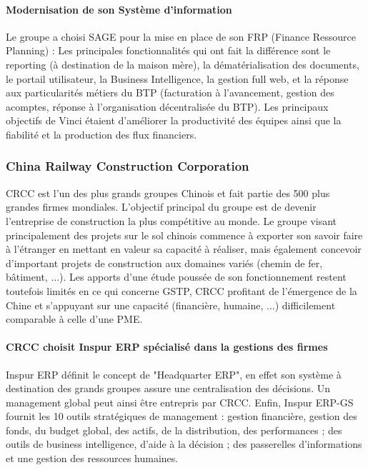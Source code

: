 								\paragraph{Modernisation de son Système d'information}
								Le groupe a choisi SAGE pour la mise en place de son FRP (Finance Ressource Planning) :
Les principales fonctionnalités qui ont fait la différence sont le reporting (à destination de la maison mère), la dématérialisation des documents, le portail utilisateur, la Business Intelligence, la gestion full web, et la réponse aux particularités métiers du BTP (facturation à l'avancement, gestion des acomptes, réponse à l'organisation décentralisée du BTP).
Les principaux objectifs de Vinci étaient d'améliorer la productivité des équipes ainsi que la fiabilité et la production des flux financiers.

					\subsubsection{China Railway Construction Corporation}
CRCC est l'un des plus grands groupes Chinois et fait partie des 500 plus grandes firmes mondiales. L'objectif principal du groupe est de devenir l'entreprise de construction la plus compétitive au monde.
Le groupe visant principalement des projets sur le sol chinois commence à exporter son savoir faire à l'étranger en mettant en valeur
sa capacité à réaliser, mais également concevoir d'important projets de construction aux domaines variés (chemin de fer, bâtiment, ...).
Les apports d'une étude poussée de son fonctionnement restent toutefois limités en ce qui concerne GSTP, 
CRCC profitant de l'émergence de la Chine et s'appuyant sur une capacité (financière, humaine, ...) difficilement comparable à celle d'une PME.


							\paragraph{CRCC choisit Inspur ERP spécialisé dans la gestions des firmes}
		Inspur ERP définit le concept de "Headquarter ERP", en effet son système à destination des grands groupes assure une centralisation des décisions.
Un management global peut ainsi être entrepris par CRCC. 
Enfin, Inspur ERP-GS fournit les 10 outils stratégiques de management : gestion financière, gestion des fonds, du budget global, des actifs, de la distribution, des performances ; des outils de business intelligence, d'aide à la décision ; des passerelles d'informations et une gestion des ressources humaines.



